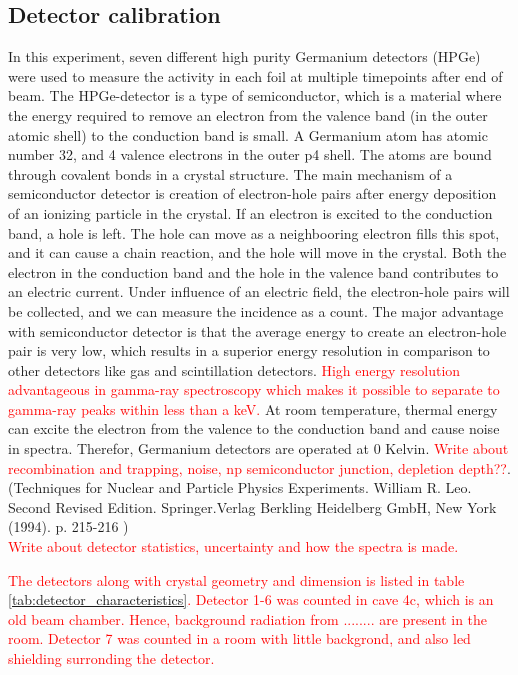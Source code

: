 \documentclass[a4paper,11pt,twoside]{book}
\begin{document}
\subsection{Detector calibration}
In this experiment, seven different high purity Germanium detectors (HPGe) were used to measure the activity in each foil at multiple timepoints after end of beam. The HPGe-detector is a type of semiconductor, which is a material where the energy required to remove an electron from the valence band (in the outer atomic shell) to the conduction band is small. A Germanium atom has atomic number 32, and 4 valence electrons in the outer p4 shell. The atoms are bound through covalent bonds in a crystal structure. The main mechanism of a semiconductor detector is creation of electron-hole pairs after energy deposition of an ionizing particle in the crystal. If an electron is excited to the conduction band, a hole is left. The hole can move as a neighbooring electron fills this spot, and it can cause a chain reaction, and the hole will move in the crystal. Both the electron in the conduction band and the hole in  the valence band contributes to an electric current. Under influence of an electric field, the electron-hole pairs will be collected, and we can measure the incidence as a count. The major advantage with semiconductor detector is that the average energy to create an electron-hole pair is very low, which results in a superior energy resolution in comparison to other detectors like gas and scintillation detectors. \textcolor{red}{High energy resolution advantageous in gamma-ray spectroscopy which makes it possible to separate to gamma-ray peaks within less than a keV.} At room temperature,  thermal energy can excite the electron from the valence to the conduction band and cause noise in spectra. Therefor, Germanium detectors are operated at 0 Kelvin. \textcolor{red}{Write about recombination and trapping, noise, np semiconductor junction, depletion depth??}. (Techniques for Nuclear and Particle Physics Experiments. William R. Leo. Second Revised Edition. Springer.Verlag Berkling Heidelberg GmbH, New York (1994). p. 215-216 )\\

\textcolor{red}{Write about detector statistics, uncertainty and how the spectra is made. }

\noindent
\textcolor{red}{
The detectors along with crystal geometry and dimension is listed in table \ref{tab:detector_characteristics}. Detector 1-6 was counted in cave 4c, which is an old beam chamber. Hence, background radiation from ........ are present in the room. Detector 7 was counted in a room with little backgrond, and also led shielding surronding the detector. }
\end{document}
